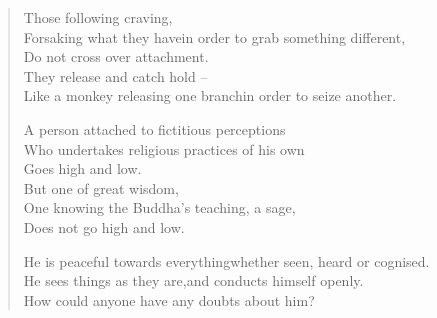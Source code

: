 \begin{verse}

 Those following craving,\\
Forsaking what they have\newline in order to grab something different,\\
Do not cross over attachment.\\
They release and catch hold --\\
Like a monkey releasing one branch\newline in order to seize another.


 A person attached to fictitious perceptions\\
Who undertakes religious practices of his own\\
Goes high and low.\\
But one of great wisdom,\\
One knowing the Buddha's teaching, a sage,\\
Does not go high and low.


 He is peaceful towards everything\newline whether seen, heard or cognised.\\
He sees things as they are,\newline and conducts himself openly.\\
How could anyone have any doubts about him?



\end{verse}
